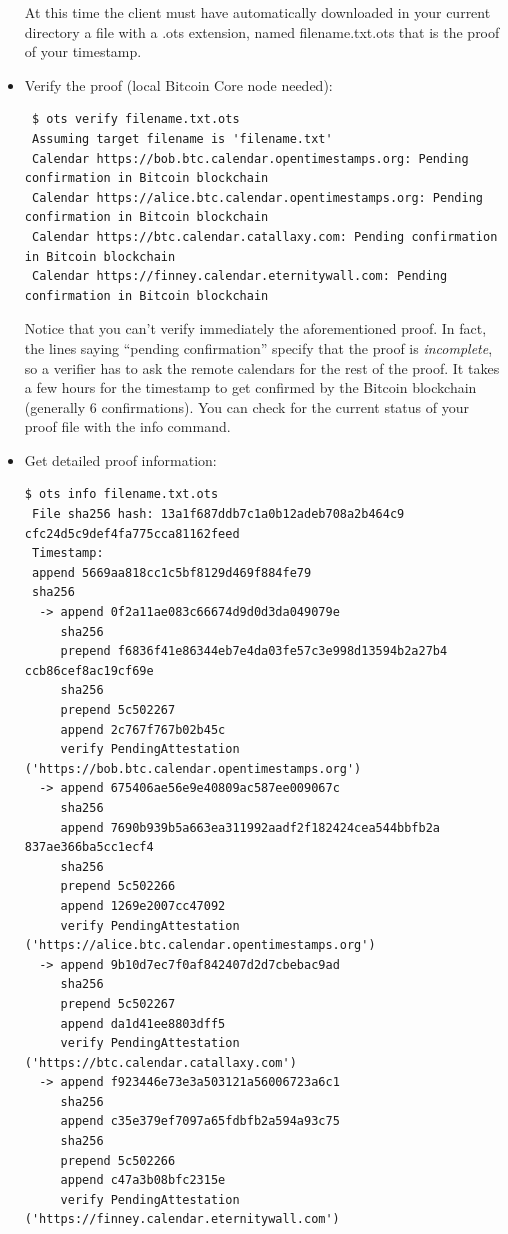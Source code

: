 \begin{itemize}
\bigskip
\noindent
At this time the client must have automatically downloaded in your current directory a file
with a .ots extension, named \colorbox{light-gray}{filename.txt.ots} that is the proof of your timestamp.
\item Verify the proof (local Bitcoin Core node needed):\bigskip
\begin{lstlisting}
 $ ots verify filename.txt.ots 
 Assuming target filename is 'filename.txt'
 Calendar https://bob.btc.calendar.opentimestamps.org: Pending confirmation in Bitcoin blockchain
 Calendar https://alice.btc.calendar.opentimestamps.org: Pending confirmation in Bitcoin blockchain
 Calendar https://btc.calendar.catallaxy.com: Pending confirmation in Bitcoin blockchain
 Calendar https://finney.calendar.eternitywall.com: Pending confirmation in Bitcoin blockchain
\end{lstlisting}
Notice that you can't verify immediately the aforementioned proof. In fact, the lines saying \enquote{pending confirmation} specify that the proof is \textit{incomplete}, so a verifier has to ask the remote calendars for the rest of the proof. It takes a few hours for the timestamp to get confirmed by the Bitcoin blockchain (generally 6 confirmations). You can check for the current status of your proof file with the \colorbox{light-gray}{info} command.
\item Get detailed proof information:\bigskip
\begin{lstlisting}[breakatwhitespace=true]
 $ ots info filename.txt.ots 
 File sha256 hash: 13a1f687ddb7c1a0b12adeb708a2b464c9 cfc24d5c9def4fa775cca81162feed
 Timestamp:
 append 5669aa818cc1c5bf8129d469f884fe79
 sha256
  -> append 0f2a11ae083c66674d9d0d3da049079e
     sha256
     prepend f6836f41e86344eb7e4da03fe57c3e998d13594b2a27b4 ccb86cef8ac19cf69e
     sha256
     prepend 5c502267
     append 2c767f767b02b45c
     verify PendingAttestation ('https://bob.btc.calendar.opentimestamps.org')
  -> append 675406ae56e9e40809ac587ee009067c
     sha256
     append 7690b939b5a663ea311992aadf2f182424cea544bbfb2a 837ae366ba5cc1ecf4
     sha256
     prepend 5c502266
     append 1269e2007cc47092
     verify PendingAttestation ('https://alice.btc.calendar.opentimestamps.org')
  -> append 9b10d7ec7f0af842407d2d7cbebac9ad
     sha256
     prepend 5c502267
     append da1d41ee8803dff5
     verify PendingAttestation ('https://btc.calendar.catallaxy.com')
  -> append f923446e73e3a503121a56006723a6c1
     sha256
     append c35e379ef7097a65fdbfb2a594a93c75
     sha256
     prepend 5c502266
     append c47a3b08bfc2315e
     verify PendingAttestation ('https://finney.calendar.eternitywall.com')

\end{lstlisting}
\end{itemize}
